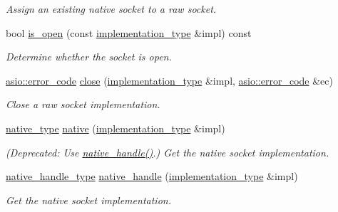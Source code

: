 \begin{DoxyCompactItemize}
\begin{DoxyCompactList}\small\item\em Assign an existing native socket to a raw socket. \end{DoxyCompactList}\item 
bool \hyperlink{classasio_1_1raw__socket__service_abd56a205f1658c69192af28632769ddc}{is\+\_\+open} (const \hyperlink{classasio_1_1raw__socket__service_aa2e0ef73d6504fbcab510cb835e9e3d9}{implementation\+\_\+type} \&impl) const 
\begin{DoxyCompactList}\small\item\em Determine whether the socket is open. \end{DoxyCompactList}\item 
\hyperlink{classasio_1_1error__code}{asio\+::error\+\_\+code} \hyperlink{classasio_1_1raw__socket__service_a76dcf2b7fa269237fbbc62f2feb21734}{close} (\hyperlink{classasio_1_1raw__socket__service_aa2e0ef73d6504fbcab510cb835e9e3d9}{implementation\+\_\+type} \&impl, \hyperlink{classasio_1_1error__code}{asio\+::error\+\_\+code} \&ec)
\begin{DoxyCompactList}\small\item\em Close a raw socket implementation. \end{DoxyCompactList}\item 
\hyperlink{classasio_1_1raw__socket__service_ac593d0ef0d19e36b2226e91476fd6566}{native\+\_\+type} \hyperlink{classasio_1_1raw__socket__service_a9549df363a51e46a039aa948670ecad6}{native} (\hyperlink{classasio_1_1raw__socket__service_aa2e0ef73d6504fbcab510cb835e9e3d9}{implementation\+\_\+type} \&impl)
\begin{DoxyCompactList}\small\item\em (Deprecated\+: Use \hyperlink{classasio_1_1raw__socket__service_abe528a1deb11b2363b94afbe8ff704ef}{native\+\_\+handle()}.) Get the native socket implementation. \end{DoxyCompactList}\item 
\hyperlink{classasio_1_1raw__socket__service_a79802711654c4d649ff11b7fe238b927}{native\+\_\+handle\+\_\+type} \hyperlink{classasio_1_1raw__socket__service_abe528a1deb11b2363b94afbe8ff704ef}{native\+\_\+handle} (\hyperlink{classasio_1_1raw__socket__service_aa2e0ef73d6504fbcab510cb835e9e3d9}{implementation\+\_\+type} \&impl)
\begin{DoxyCompactList}\small\item\em Get the native socket implementation. \end{DoxyCompactList}\item 

\end{DoxyCompactItemize}
